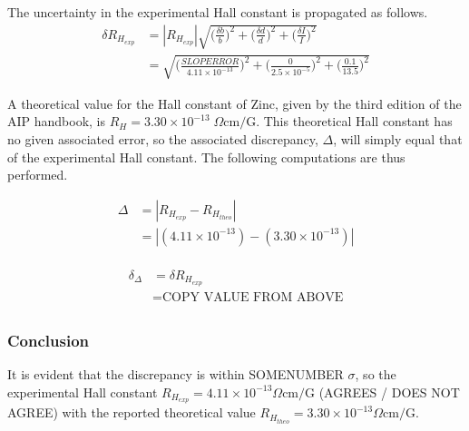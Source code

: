 \documentclass[a4paper]{article}
\begin{document}
The uncertainty in the experimental Hall constant is propagated as follows.
\begin{align*}
\delta R_{H_{exp}} &= | R_{H_{exp}} | 
                      \sqrt{
                      	\Big( \frac{\delta b}{b} \Big) ^2
                      	+
                      	\Big( \frac{\delta d}{d} \Big) ^2
                      	+
                      	\Big( \frac{\delta I}{I} \Big) ^2
                      } \\
                       &=
                   	 \sqrt{
                      	\Big( \frac{SLOPERROR}{4.11 \times 10^{-13}} \Big) ^2
                      	+
                      	\Big( \frac{0}{2.5 \times 10^{-5}} \Big) ^2
                      	+
                      	\Big( \frac{0.1}{13.5} \Big) ^2
                      } 
\end{align*}

\qq A theoretical value for the Hall constant of Zinc, given by the
third edition of the AIP handbook, is $R_H = 3.30 \times 10^{-13} \;
\Omega \text{cm/G}$. This theoretical Hall constant has no given
associated error, so the associated discrepancy, $\Delta$, will simply
equal that of the experimental Hall constant. The following
computations are thus performed.

\begin{align*}
\Delta &= | R_{H_{exp}} - R_{H_{theo}} | \\
	   &= | (4.11 \times 10^{-13}) - (3.30 \times 10^{-13}) | \\
\end{align*}

\begin{align*}
\delta_{\Delta} &= \delta R_{H_{exp}} \\
				&= \text{COPY VALUE FROM ABOVE} \\
\end{align*}

\subsubsection{Conclusion}
\qq It is evident that the discrepancy is within SOMENUMBER $\sigma$,
so the experimental Hall constant $R_{H_{exp}} = 4.11 \times 10^{-13}
\Omega \text{cm/G}$ (AGREES / DOES NOT AGREE) with the reported
theoretical value $R_{H_{theo}} = 3.30 \times 10^{-13} \Omega
\text{cm/G}$.
\end{document}
